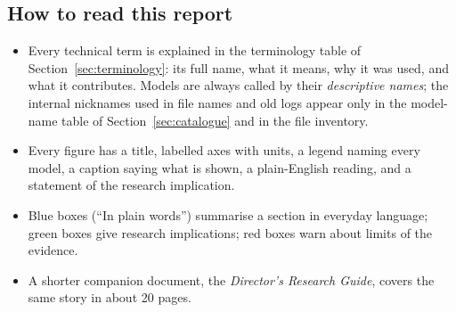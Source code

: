 \subsection{How to read this report}
\begin{itemize}
\item Every technical term is explained in the terminology table of Section~\ref{sec:terminology}: its full name, what it means, why it was used, and what it contributes. Models are always called by their \emph{descriptive names}; the internal nicknames used in file names and old logs appear only in the model-name table of Section~\ref{sec:catalogue} and in the file inventory.
\item Every figure has a title, labelled axes with units, a legend naming every model, a caption saying what is shown, a plain-English reading, and a statement of the research implication.
\item Blue boxes (``In plain words'') summarise a section in everyday language; green boxes give research implications; red boxes warn about limits of the evidence.
\item A shorter companion document, the \emph{Director's Research Guide}, covers the same story in about 20 pages.
\end{itemize}
